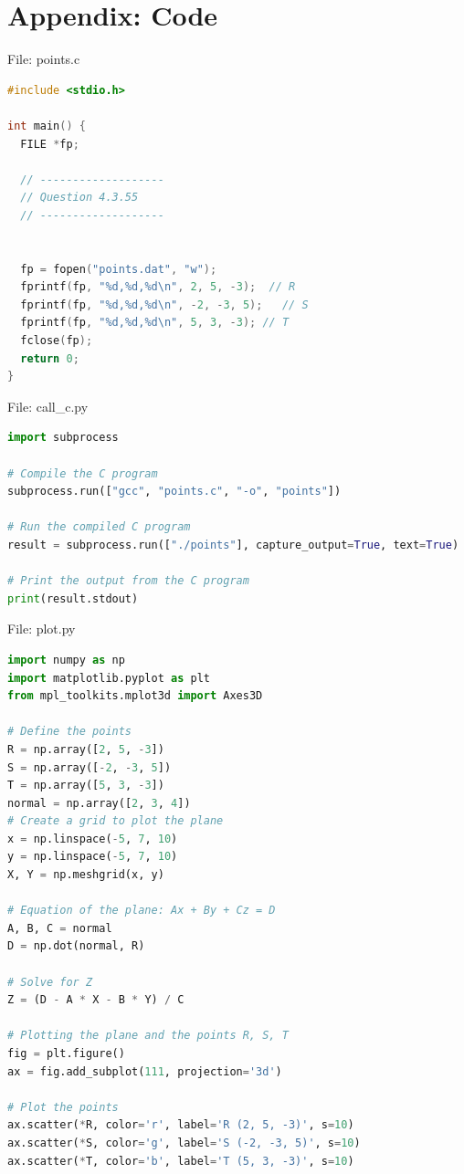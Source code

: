 \documentclass{beamer}
\numberwithin{equation}{section}
\theoremstyle{remark}
\begin{document}
\section*{Appendix: Code}

\begin{frame}[fragile]{File: points.c}
\begin{lstlisting}[language=C]
#include <stdio.h>

int main() {
  FILE *fp;

  // -------------------
  // Question 4.3.55
  // -------------------


  fp = fopen("points.dat", "w");
  fprintf(fp, "%d,%d,%d\n", 2, 5, -3);  // R
  fprintf(fp, "%d,%d,%d\n", -2, -3, 5);   // S
  fprintf(fp, "%d,%d,%d\n", 5, 3, -3); // T
  fclose(fp);
  return 0;
}
\end{lstlisting}
\end{frame}

\begin{frame}[fragile]{File: call\_c.py}
\begin{lstlisting}[language=Python]
import subprocess

# Compile the C program
subprocess.run(["gcc", "points.c", "-o", "points"])

# Run the compiled C program
result = subprocess.run(["./points"], capture_output=True, text=True)

# Print the output from the C program
print(result.stdout)
\end{lstlisting}
\end{frame}

\begin{frame}[fragile]{File: plot.py}
\begin{lstlisting}[language=Python]
import numpy as np
import matplotlib.pyplot as plt
from mpl_toolkits.mplot3d import Axes3D

# Define the points
R = np.array([2, 5, -3])
S = np.array([-2, -3, 5])
T = np.array([5, 3, -3])
normal = np.array([2, 3, 4])
# Create a grid to plot the plane
x = np.linspace(-5, 7, 10)
y = np.linspace(-5, 7, 10)
X, Y = np.meshgrid(x, y)

# Equation of the plane: Ax + By + Cz = D
A, B, C = normal
D = np.dot(normal, R)

# Solve for Z
Z = (D - A * X - B * Y) / C

# Plotting the plane and the points R, S, T
fig = plt.figure()
ax = fig.add_subplot(111, projection='3d')

# Plot the points
ax.scatter(*R, color='r', label='R (2, 5, -3)', s=10)
ax.scatter(*S, color='g', label='S (-2, -3, 5)', s=10)
ax.scatter(*T, color='b', label='T (5, 3, -3)', s=10)
\end{lstlisting}
\end{frame}
\end{document}
